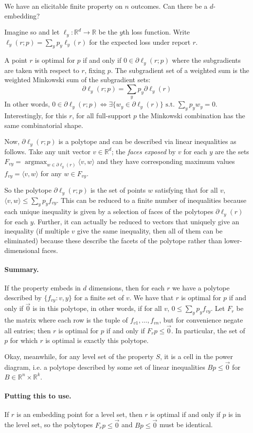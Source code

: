\documentclass[12pt]{article}
\DeclareMathOperator*{\argmax}{\textrm{argmax}}
\newcommand{\reals}{\mathbb{R}}
\begin{document}
We have an elicitable finite property on $n$ outcomes.
Can there be a $d$-embedding?

Imagine so and let $\ell_y: \reals^d \to \reals$ be the $y$th loss function.
Write $\ell_y(r;p) = \sum_y p_y \ell_y(r)$ for the expected loss under report $r$.

A point $r$ is optimal for $p$ if and only if $0 \in \partial \ell_y(r;p)$ where the subgradients are taken with respect to $r$, fixing $p$.
The subgradient set of a weighted sum is the weighted Minkowski sum of the subgradient sets:
  \[ \partial \ell_y(r;p) = \sum_y p_y \partial \ell_y(r) \]
In other words, $0 \in \partial \ell_y(r;p) \iff \exists \{w_y \in \partial \ell_y(r) \} \text{~s.t.~} \sum_y p_y w_y = 0$.
Interestingly, for this $r$, for all full-support $p$ the Minkowski combination has the same combinatorial shape.

Now, $\partial \ell_y(r;p)$ is a polytope and can be described via linear inequalities as follows.
Take any unit vector $v \in \reals^d$; the \emph{faces exposed} by $v$ for each $y$ are the sets $F_{vy} = \argmax_{w \in \partial \ell_y(r)} \langle v, w \rangle$ and they have corresponding maximum values $f_{vy} = \langle v,w \rangle$ for any $w \in F_{vy}$.

So the polytope $\partial \ell_y(r;p)$ is the set of points $w$ satisfying that for all $v$, $\langle v, w \rangle \leq \sum_y p_y f_{vy}$.
This can be reduced to a finite number of inequalities because each unique inequality is given by a selection of faces of the polytopes $\partial \ell_y(r)$ for each $y$.
Further, it can actually be reduced to vectors that uniquely give an inequality (if multiple $v$ give the same inequality, then all of them can be eliminated) because these describe the facets of the polytope rather than lower-dimensional faces.

\paragraph{Summary.}
If the property embeds in $d$ dimensions, then for each $r$ we have a polytope described by $\{f_{vy} : v,y\}$ for a finite set of $v$.
We have that $r$ is optimal for $p$ if and only if $\vec{0}$ is in this polytope, in other words, if for all $v$, $0 \leq \sum_y p_y f_{vy}$.
Let $F_r$ be the matrix where each row is the tuple of $f_{v1}, \dots, f_{vn}$, but for convenience negate all entries; then $r$ is optimal for $p$ if and only if $F_r p \leq \vec{0}$.
In particular, the set of $p$ for which $r$ is optimal is exactly this polytope.

Okay, meanwhile, for any level set of the property $S$, it is a cell in the power diagram, i.e. a polytope described by some set of linear inequalities $Bp \leq \vec{0}$ for $B \in \reals^n \times \reals^k$.

\paragraph{Putting this to use.}
If $r$ is an embedding point for a level set, then $r$ is optimal if and only if $p$ is in the level set, so the polytopes $F_r p \leq \vec{0}$ and $Bp \leq \vec{0}$ must be identical.
\end{document}

